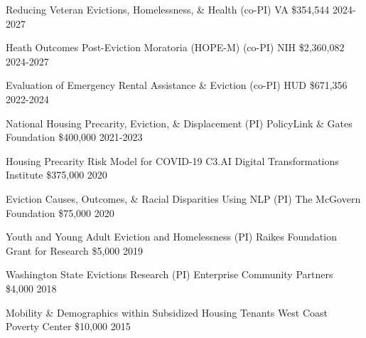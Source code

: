 



\begin{cvhonors}

  \cvhonor
    {Reducing Veteran Evictions, Homelessness, \& Health (co-PI)} %
    {VA} %
    {\$354,544} %
    {2024-2027} %
    
  \cvhonor
    {Heath Outcomes Post-Eviction Moratoria (HOPE-M) (co-PI)} %
    {NIH} %
    {\$2,360,082} %
    {2024-2027} %
    
  \cvhonor
    {Evaluation of Emergency Rental Assistance \& Eviction (co-PI)} %
    {HUD} %
    {\$671,356} %
    {2022-2024} %

  \cvhonor
    {National Housing Precarity, Eviction, \& Displacement (PI)} %
    {PolicyLink \& Gates Foundation} %
    {\$400,000} %
    {2021-2023} %

  \cvhonor
    {Housing Precarity Risk Model for COVID-19} %
    {C3.AI Digital Transformations Institute} %
    {\$375,000} %
    {2020} %

  \cvhonor
    {Eviction Causes, Outcomes, \& Racial Disparities Using NLP (PI)} %
    {The McGovern Foundation} %
    {\$75,000} %
    {2020} %

  \cvhonor
    {Youth and Young Adult Eviction and Homelessness (PI)} %
    {Raikes Foundation Grant for Research} %
    {\$5,000} %
    {2019} %

  \cvhonor
    {Washington State Evictions Research (PI)} %
    {Enterprise Community Partners} %
    {\$4,000} %
    {2018} %

   \cvhonor
    {Mobility \& Demographics within Subsidized Housing Tenants} %
    {West Coast Poverty Center} %
    {\$10,000} %
    {2015} %
\end{cvhonors}


